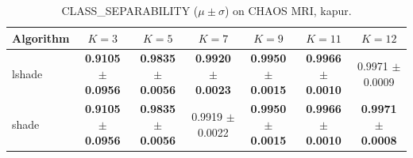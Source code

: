 \begin{table}[htbp]
\centering
\caption{CLASS_SEPARABILITY ($\mu \pm \sigma$) on CHAOS MRI, kapur.}
\label{tab:exp2-kapur-class_separability}
\begin{tabular}{lcccccc}
\toprule
Algorithm & $K=3$ & $K=5$ & $K=7$ & $K=9$ & $K=11$ & $K=12$ \\
\midrule
lshade & \textbf{0.9105 $\pm$ 0.0956} & \textbf{0.9835 $\pm$ 0.0056} & \textbf{0.9920 $\pm$ 0.0023} & \textbf{0.9950 $\pm$ 0.0015} & \textbf{0.9966 $\pm$ 0.0010} & 0.9971 $\pm$ 0.0009 \\
shade & \textbf{0.9105 $\pm$ 0.0956} & \textbf{0.9835 $\pm$ 0.0056} & 0.9919 $\pm$ 0.0022 & \textbf{0.9950 $\pm$ 0.0015} & \textbf{0.9966 $\pm$ 0.0010} & \textbf{0.9971 $\pm$ 0.0008} \\
\bottomrule
\end{tabular}
\end{table}